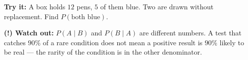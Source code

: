 \documentclass[12pt]{article}
\begin{document}
\begin{tryitbox}
\textbf{Try it:} \quad A box holds $12$ pens, $5$ of them blue. Two are drawn without replacement. Find $P(\text{both blue})$.\\[2pt]
\end{tryitbox}

\begin{watchoutbox}
\textbf{(!) Watch out:} $P(A \mid B)$ and $P(B \mid A)$ are different numbers. A test that
catches $90\%$ of a rare condition does not mean a positive result is $90\%$ likely to be real
--- the rarity of the condition is in the other denominator.
\end{watchoutbox}
\end{document}
